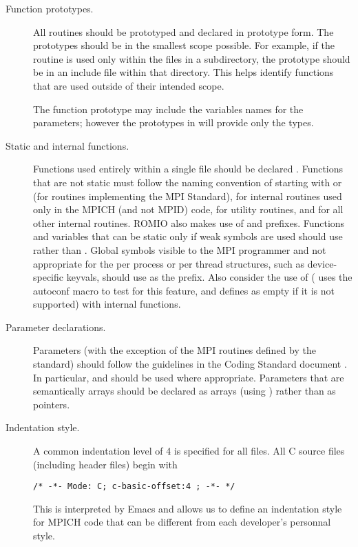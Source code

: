 \documentclass{article}
\begin{document}
\begin{description}
\item[Function prototypes.]
All routines should be prototyped and declared in prototype form.  The
prototypes should be in the 
smallest scope possible.  For example, if the routine is used only
within the files in a subdirectory, the prototype should be in an
include file within that directory.  This helps identify functions that are
used outside of their intended scope.

The function prototype may include the variables names for the parameters;
however the prototypes in  will provide only the types.

\item[Static and internal functions.]
Functions used entirely within a single file should be declared
.  Functions that are not static must follow the naming
convention of starting with  or  (for routines
implementing the MPI Standard),  for internal routines
used only in the MPICH (and not MPID) code,  for utility
routines, and  for all
other internal routines.  ROMIO also makes use of  and
 prefixes.
Functions and variables that can be static only if weak symbols are
used should use  rather than .
Global symbols visible to the MPI programmer and not appropriate for
the per process or per thread structures, such as device-specific
keyvals, should use 
 as the 
prefix.  Also consider the use of  ( uses the
autoconf macro  to test for this feature, and
defines  as empty if it is not supported) with
internal functions.

\item[Parameter declarations.]
Parameters (with the exception of the MPI routines defined by the
standard) should follow the guidelines in the Coding Standard document
\cite{coding-standards}.  In 
particular,  and  should be used where appropriate.
Parameters that are semantically arrays should be declared as arrays
(using \code{[]}) rather than as pointers.

\item[Indentation style.]
A common indentation level of 4 is specified for all files.
All C source files (including header files) begin with 
\begin{verbatim}
/* -*- Mode: C; c-basic-offset:4 ; -*- */
\end{verbatim}
This is interpreted by Emacs and allows us to define an
indentation style for MPICH code 
that can be different from each developer's personnal style.


\end{description}
\end{document}
